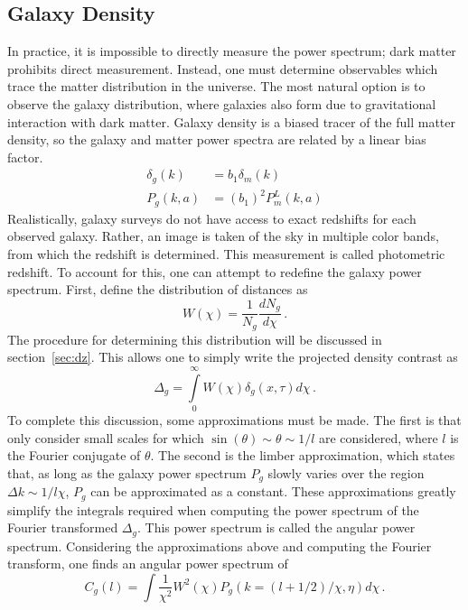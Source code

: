 \subsection{Galaxy Density}
In practice, it is impossible to directly measure the power spectrum; dark matter prohibits direct measurement. Instead, one must determine observables which trace the matter distribution in the universe. The most natural option is to observe the galaxy distribution, where galaxies also form due to gravitational interaction with dark matter. Galaxy density is a biased tracer of the full matter density, so the galaxy and matter power spectra are related by a linear bias factor.
\begin{equation}
	\begin{split}
		\delta_g(k) &= b_1 \delta_m(k) \\
		P_g(k,a) &= (b_1)^2P_m^L(k,a)
	\end{split}
\end{equation}
Realistically, galaxy surveys do not have access to exact redshifts for each observed galaxy. Rather, an image is taken of the sky in multiple color bands, from which the redshift is determined. This measurement is called photometric redshift. To account for this, one can attempt to redefine the galaxy power spectrum. First, define the distribution of distances as
\begin{equation}
	W(\chi) = \frac{1}{N_g}\frac{dN_g}{d\chi}\,.
\end{equation}
The procedure for determining this distribution will be discussed in section~\ref{sec:dz}. This allows one to simply write the projected density contrast as
\begin{equation}
	\Delta_g = \int\limits_0^\infty W(\chi)\delta_g(x,\tau)d\chi\,.
\end{equation}
To complete this discussion, some approximations must be made. The first is that only consider small scales for which $\sin(\theta)\sim \theta \sim 1/l$ are considered, where $l$ is the Fourier conjugate of $\theta$. The second is the limber approximation, which states that, as long as the galaxy power spectrum $P_g$ slowly varies over the region $\Delta k \sim 1/l\chi$, $P_g$ can be approximated as a constant. These approximations greatly simplify the integrals required when computing the power spectrum of the Fourier transformed $\Delta_g$. This power spectrum is called the angular power spectrum. Considering the approximations above and computing the Fourier transform, one finds an angular power spectrum of
\begin{equation}
 	C_g(l) =\int \frac{1}{\chi^2}W^2(\chi)P_g(k=(l+1/2)/\chi,\eta) d\chi\,.
\end{equation} 
